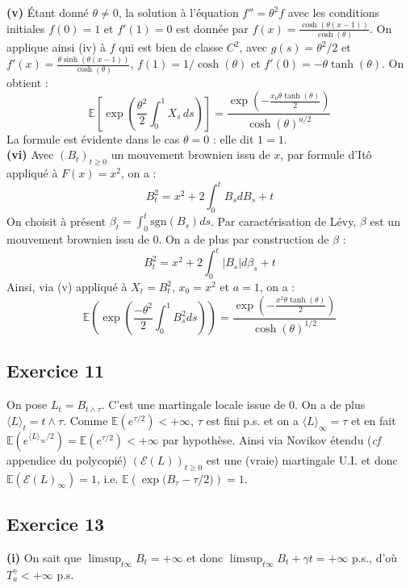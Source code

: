 \documentclass[a4paper,12pt]{article}
\newcommand{\E}{\mathbb{E}}
\newcommand{\sme}{\mathcal{E}}
\begin{document}
\textbf{(v)} Étant donné $\theta \neq 0$, la solution à l'équation $f''=\theta^2 f$ avec les conditions initiales $f(0)=1$ et $f'(1)=0$ est donnée par $f(x)=\frac{\cosh (\theta(x-1))}{\cosh(\theta)}$. On applique ainsi (iv) à $f$ qui est bien de classe $C^2$, avec $g(s)=\theta^2/2$ et $f'(x) = \frac{\theta \sinh(\theta(x-1))}{\cosh(\theta)}$, $f(1)=1/\cosh(\theta)$ et $f'(0)=-\theta \tanh (\theta)$. On obtient :
$$
\E \left[ \exp\left( \frac{\theta^2}{2} \int_0^1 X_s \, ds \right) \right] = \frac{\exp\left( -\frac{x_0 \theta \tanh(\theta)}{2} \right)}{\cosh(\theta)^{a/2}}
$$
La formule est évidente dans le cas $\theta=0$ : elle dit $1=1$. \\

\textbf{(vi)} Avec $(B_t)_{t \geq 0}$ un mouvement brownien issu de $x$, par formule d'Itô appliqué à $F(x)=x^2$, on a :
$$B_t^2 = x^2 + 2 \int_0^t B_s dB_s + t$$
On choisit à présent $\beta_t = \int_0^t \text{sgn} (B_s) ds$. Par caractérisation de Lévy, $\beta$ est un mouvement brownien issu de $0$. On a de plus par construction de $\beta$ :
$$B_t^2 = x^2 + 2 \int_0^t |B_s| d \beta_s + t$$
Ainsi, via (v) appliqué à $X_t=B_t^2$, $x_0=x^2$ et $a=1$, on a :
$$\E \left( \exp{\left( \frac{-\theta^2}{2} \int_0^1 B_s^2 ds\right) } \right) = \frac{\exp\left( -\frac{x^2 \theta \tanh(\theta)}{2} \right)}{\cosh(\theta)^{1/2}}$$

\subsection{Exercice 11}
On pose $L_t = B_{t \wedge \tau}$. C'est une martingale locale issue de $0$. On a de plus $\langle L \rangle_t = t \wedge \tau$. Comme $\E \left( e^{\tau /2} \right) < + \infty$, $\tau$ est fini p.s. et on a $\langle L \rangle_{\infty} = \tau$ et en fait $\E \left( e^{\langle L \rangle_{\infty}/2} \right) = \E \left( e^{\tau /2} \right) < + \infty$ par hypothèse. Ainsi via Novikov étendu (\textit{cf} appendice du polycopié) $(\sme (L))_{t \geq 0}$ est une (vraie) martingale U.I. et donc $\E \left( \sme (L)_{\infty} \right) = 1$, i.e. $\E \left( \exp{(B_{\tau} - \tau /2}) \right) = 1$.

\subsection{Exercice 13}
\textbf{(i)} On sait que $\limsup_{t \infty} B_t = + \infty$ et donc $\limsup_{t \infty} B_t+\gamma t =+ \infty$ p.s., d'où $T^{\gamma}_a < + \infty$ p.s. \\
\end{document}
